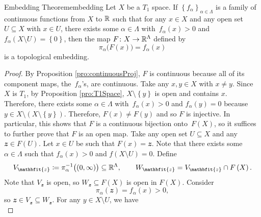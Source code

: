 \documentclass[math]{amznotes}
\theoremstyle{remark}
\begin{document}
\begin{thmbox}{Embedding Theorem}{embedding}
    Let $X$ be a $T_1$ space. If $\left\{f_{\alpha}\right\}_{\alpha \in \Lambda}$ is a family of continuous functions from $X$ to $\mathbb{R}$ such that for any $x \in X$ and any open set $U \subseteq X$ with $x \in U$, there exists some $\alpha \in \Lambda$ with~$f_{\alpha}\left(x\right) > 0$ and $f_{\alpha}\left(X \setminus U\right) = \left\{0\right\}$, then the map $F \colon X \to \mathbb{R}^{\Lambda}$ defined by 
    \begin{equation*}
        \pi_{\alpha}\bigl(F\left(x\right)\bigr) = f_{\alpha}\left(x\right)
    \end{equation*}
    is a topological embedding.
    \tcblower
    \begin{proof}
        By Proposition \ref{pro:continuousProj}, $F$ is continuous because all of its component maps, the~$f_{\alpha}$'s, are continuous. Take any $x, y \in X$ with $x \neq y$. Since $X$ is $T_1$, by Proposition \ref{pro:T1Space}, $X \setminus \left\{y\right\}$ is open and contains $x$. Therefore, there exists some $\alpha \in \Lambda$ with~$f_{\alpha}\left(x\right) > 0$ and $f_{\alpha}\left(y\right) = 0$ because $y \in X \setminus \left(X \setminus \left\{y\right\}\right)$. Therefore, $F\left(x\right) \neq F\left(y\right)$ and so $F$ is injective. In particular, this shows that $F$ is a continuous bijection onto~$F\left(X\right)$, so it suffices to further prove that $F$ is an open map. Take any open set $U \subseteq X$ and any $\mathbfit{z} \in F\left(U\right)$. Let $x \in U$ be such that $F\left(x\right) = \mathbfit{z}$. Note that there exists some $\alpha \in \Lambda$ such that $f_{\alpha}\left(x\right) > 0$ and $f\left(X \setminus U\right) = 0$. Define 
        \begin{equation*}
            V_{\mathbfit{z}} \coloneqq \pi_{\alpha}^{-1}\bigl(\left(0, \infty\right)\bigr) \subseteq \R^{\Lambda}, \qquad W_{\mathbfit{z}} = V_{\mathbfit{z}} \cap F\left(X\right).
        \end{equation*}
        Note that $V_{\mathbfit{z}}$ is open, so $W_{\mathbfit{z}} \subseteq F\left(X\right)$ is open in $F\left(X\right)$. Consider 
        \begin{equation*}
            \pi_{\alpha}\left(\mathbfit{z}\right) = f_{\alpha}\left(x\right) > 0,
        \end{equation*}
        so $\mathbfit{z} \in V_{\mathbfit{z}} \subseteq W_{\mathbfit{z}}$. For any $y \in X \setminus U$, we have 
        \begin{equation*}

\end{equation*}
\end{proof}
\end{thmbox}
\end{document}
